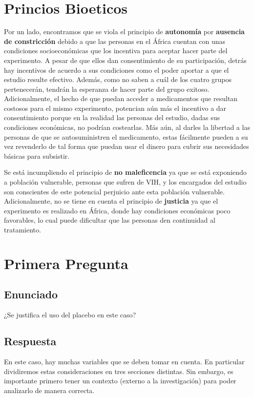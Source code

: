 \section*{Princios Bioeticos}
Por un lado, encontramos que se viola el principio de \textbf{autonomía} por \textbf{ausencia de constricción} debido a que las personas en el África cuentan con unas condiciones socioeconómicas que los incentiva para aceptar hacer parte del experimento. A pesar de que ellos dan consentimiento de su participación, detrás hay incentivos de acuerdo a sus condiciones como el poder aportar a que el estudio resulte efectivo. Además, como no saben a cuál de los cuatro grupos pertenecerán, tendrán la esperanza de hacer parte del grupo exitoso. Adicionalmente, el hecho de que puedan acceder a medicamentos que resultan costosos para el mismo experimento, potencian aún más el incentivo a dar consentimiento porque en la realidad las personas del estudio, dadas sus condiciones económicas, no podrían costearlas. Más aún, al darles la libertad a las personas de que se autosuministren el medicamento, estas fácilmente pueden a su vez revenderlo de tal forma que puedan usar el dinero para cubrir sus necesidades básicas para subsistir.

Se está incumpliendo el principio de \textbf{no maleficencia} ya que se está exponiendo a población vulnerable, personas que sufren de VIH, y los encargados del estudio son conscientes de este potencial perjuicio ante esta población vulnerable. Adicionalmente, no se tiene en cuenta el principio de \textbf{justicia} ya que el experimento es realizado en África, donde hay condiciones económicas poco favorables, lo cual puede dificultar que las personas den continuidad al tratamiento.


\section*{Primera Pregunta}
\subsection*{Enunciado}
¿Se justifica el uso del placebo en este caso?

\subsection*{Respuesta}

En este caso, hay muchas variables que se deben tomar en cuenta. En particular dividiremos estas consideraciones en tres secciones distintas. Sin embargo, es importante primero tener un contexto (externo a la investigación) para poder analizarlo de manera correcta.

